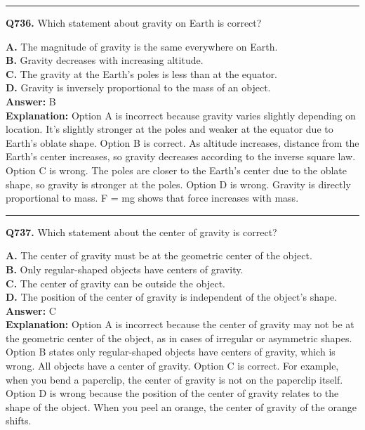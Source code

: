 \documentclass[12pt]{article}
\begin{document}
\hrule
\vspace{1em}


\noindent
\textbf{Q736.} Which statement about gravity on Earth is correct?



\textbf{A.} The magnitude of gravity is the same everywhere on Earth. \\
\textbf{B.} Gravity decreases with increasing altitude. \\
\textbf{C.} The gravity at the Earth's poles is less than at the equator. \\
\textbf{D.} Gravity is inversely proportional to the mass of an object. \\

\textbf{Answer:} B \\
\textbf{Explanation:} Option A is incorrect because gravity varies slightly depending on location. It's slightly stronger at the poles and weaker at the equator due to Earth's oblate shape.
Option B is correct. As altitude increases, distance from the Earth's center increases, so gravity decreases according to the inverse square law.
Option C is wrong. The poles are closer to the Earth's center due to the oblate shape, so gravity is stronger at the poles.
Option D is wrong. Gravity is directly proportional to mass.
F
=
mg
shows that force increases with mass.

\hrule
\vspace{1em}


\noindent
\textbf{Q737.} Which statement about the center of gravity is correct?



\textbf{A.} The center of gravity must be at the geometric center of the object. \\
\textbf{B.} Only regular-shaped objects have centers of gravity. \\
\textbf{C.} The center of gravity can be outside the object. \\
\textbf{D.} The position of the center of gravity is independent of the object's shape. \\

\textbf{Answer:} C \\
\textbf{Explanation:} Option A is incorrect because the center of gravity may not be at the geometric center of the object, as in cases of irregular or asymmetric shapes.
Option B states only regular-shaped objects have centers of gravity, which is wrong. All objects have a center of gravity.
Option C is correct. For example, when you bend a paperclip, the center of gravity is not on the paperclip itself.
Option D is wrong because the position of the center of gravity relates to the shape of the object. When you peel an orange, the center of gravity of the orange shifts.
\end{document}
